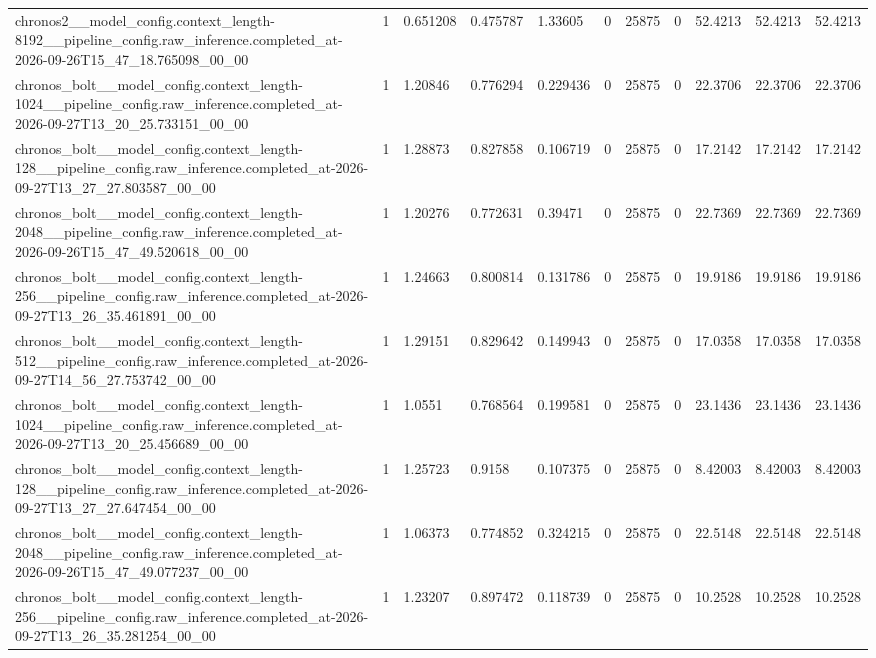 \begin{tabular}{lllllllllll}
chronos2\_\_model\_config.context\_length-8192\_\_pipeline\_config.raw\_inference.completed\_at-2026-09-26T15\_47\_18.765098\_00\_00 & 1 & 0.651208 & 0.475787 & 1.33605 & 0 & 25875 & 0 & 52.4213 & 52.4213 & 52.4213 \\
chronos\_bolt\_\_model\_config.context\_length-1024\_\_pipeline\_config.raw\_inference.completed\_at-2026-09-27T13\_20\_25.733151\_00\_00 & 1 & 1.20846 & 0.776294 & 0.229436 & 0 & 25875 & 0 & 22.3706 & 22.3706 & 22.3706 \\
chronos\_bolt\_\_model\_config.context\_length-128\_\_pipeline\_config.raw\_inference.completed\_at-2026-09-27T13\_27\_27.803587\_00\_00 & 1 & 1.28873 & 0.827858 & 0.106719 & 0 & 25875 & 0 & 17.2142 & 17.2142 & 17.2142 \\
chronos\_bolt\_\_model\_config.context\_length-2048\_\_pipeline\_config.raw\_inference.completed\_at-2026-09-26T15\_47\_49.520618\_00\_00 & 1 & 1.20276 & 0.772631 & 0.39471 & 0 & 25875 & 0 & 22.7369 & 22.7369 & 22.7369 \\
chronos\_bolt\_\_model\_config.context\_length-256\_\_pipeline\_config.raw\_inference.completed\_at-2026-09-27T13\_26\_35.461891\_00\_00 & 1 & 1.24663 & 0.800814 & 0.131786 & 0 & 25875 & 0 & 19.9186 & 19.9186 & 19.9186 \\
chronos\_bolt\_\_model\_config.context\_length-512\_\_pipeline\_config.raw\_inference.completed\_at-2026-09-27T14\_56\_27.753742\_00\_00 & 1 & 1.29151 & 0.829642 & 0.149943 & 0 & 25875 & 0 & 17.0358 & 17.0358 & 17.0358 \\
chronos\_bolt\_\_model\_config.context\_length-1024\_\_pipeline\_config.raw\_inference.completed\_at-2026-09-27T13\_20\_25.456689\_00\_00 & 1 & 1.0551 & 0.768564 & 0.199581 & 0 & 25875 & 0 & 23.1436 & 23.1436 & 23.1436 \\
chronos\_bolt\_\_model\_config.context\_length-128\_\_pipeline\_config.raw\_inference.completed\_at-2026-09-27T13\_27\_27.647454\_00\_00 & 1 & 1.25723 & 0.9158 & 0.107375 & 0 & 25875 & 0 & 8.42003 & 8.42003 & 8.42003 \\
chronos\_bolt\_\_model\_config.context\_length-2048\_\_pipeline\_config.raw\_inference.completed\_at-2026-09-26T15\_47\_49.077237\_00\_00 & 1 & 1.06373 & 0.774852 & 0.324215 & 0 & 25875 & 0 & 22.5148 & 22.5148 & 22.5148 \\
chronos\_bolt\_\_model\_config.context\_length-256\_\_pipeline\_config.raw\_inference.completed\_at-2026-09-27T13\_26\_35.281254\_00\_00 & 1 & 1.23207 & 0.897472 & 0.118739 & 0 & 25875 & 0 & 10.2528 & 10.2528 & 10.2528 \\

\end{tabular}
